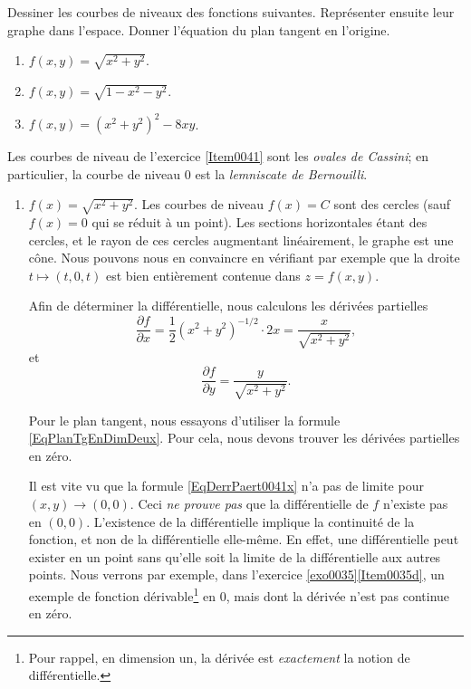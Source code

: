 \begin{example}     \label{EXooELTHooDdJyJE}
	Dessiner les courbes de niveaux des fonctions suivantes. Représenter ensuite leur graphe dans l'espace. Donner l'équation du plan tangent en l'origine.
	\begin{enumerate}
		\item 			$f(x,y) = \sqrt{x^2+y^2}$.
		\item 			$f(x,y) = \sqrt{1-x^2-y^2}$.
		\item\label{Item0041}	$f(x,y) = (x^2+y^2)^2-8xy$.
	\end{enumerate}
	Les courbes de niveau de l'exercice \ref{Item0041} sont  les \emph{ovales de Cassini}; en particulier, la courbe de niveau 0 est la \emph{lemniscate de Bernouilli}.

	\begin{enumerate}
		\item
		      $f(x)=\sqrt{x^2+y^2}$. Les courbes de niveau $f(x)=C$ sont des cercles (sauf $f(x)=0$ qui se réduit à un point). Les sections horizontales étant des cercles, et le rayon de ces cercles augmentant linéairement, le graphe est une cône. Nous pouvons nous en convaincre en vérifiant par exemple que la droite $t\mapsto(t,0,t)$ est bien entièrement contenue dans $z=f(x,y)$.

		      Afin de déterminer la différentielle, nous calculons les dérivées partielles
		      \begin{equation}		\label{EqDerrPaert0041x}
			      \frac{ \partial f }{ \partial x }=\frac{1}{ 2 }(x^2+y^2)^{-1/2}\cdot 2x=\frac{ x }{ \sqrt{x^2+y^2} },
		      \end{equation}
		      et
		      \begin{equation}		\label{EqDerrPart0041y}
			      \frac{ \partial f }{ \partial y }=\frac{ y }{ \sqrt{x^2+y^2} }.
		      \end{equation}

		      Pour le plan tangent, nous essayons d'utiliser la formule  \eqref{EqPlanTgEnDimDeux}. Pour cela, nous devons trouver les dérivées partielles en zéro.

		      Il est vite vu que la formule \eqref{EqDerrPaert0041x} n'a pas de limite pour $(x,y)\to(0,0)$. Ceci \emph{ne prouve pas} que la différentielle de $f$ n'existe pas en $(0,0)$. L'existence de la différentielle implique la continuité de la fonction, et non de la différentielle elle-même. En effet, une différentielle peut exister en un point sans qu'elle soit la limite de la différentielle aux autres points. Nous verrons par exemple, dans l'exercice \ref{exo0035}\ref{Item0035d}, un exemple de fonction dérivable\footnote{Pour rappel, en dimension un, la dérivée est \emph{exactement} la notion de différentielle.} en $0$, mais dont la dérivée n'est pas continue en zéro.


\end{enumerate}
\end{example}

